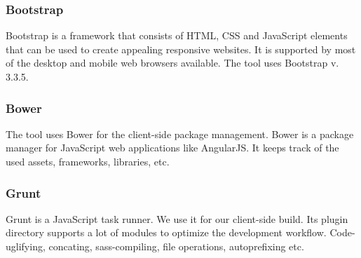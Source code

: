 \subsubsection{Bootstrap}
Bootstrap is a framework that consists of HTML, CSS and JavaScript elements that can be used to create appealing responsive websites. It is supported by most of the desktop and mobile web browsers available. The tool uses Bootstrap v. 3.3.5. \cite{bootstrap}

\subsubsection{Bower}
The tool uses Bower for the client-side package management. Bower is a package manager for JavaScript web applications like AngularJS. It keeps track of the used assets, frameworks, libraries, etc. \cite{bower}  

\subsubsection{Grunt}
Grunt is a JavaScript task runner. We use it for our client-side build. Its plugin directory supports a lot of modules to optimize the development workflow. Code-uglifying, concating, sass-compiling, file operations, autoprefixing etc. \cite{grunt} 

